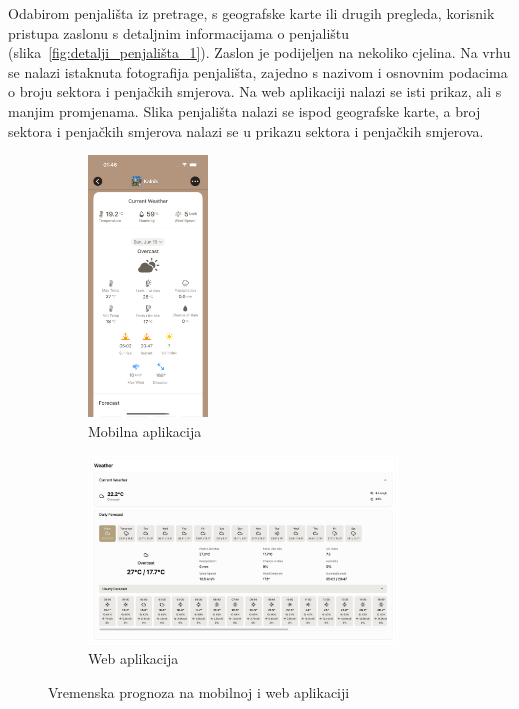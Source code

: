 Odabirom penjališta iz pretrage, s geografske karte ili drugih pregleda, korisnik pristupa zaslonu s detaljnim informacijama o penjalištu (slika~\ref{fig:detalji_penjališta_1}). Zaslon je podijeljen na nekoliko cjelina. Na vrhu se nalazi istaknuta fotografija penjališta, zajedno s nazivom i osnovnim podacima o broju sektora i penjačkih smjerova. 
Na web aplikaciji nalazi se isti prikaz, ali s manjim promjenama. Slika penjališta nalazi se ispod geografske karte, a broj sektora i penjačkih smjerova nalazi se u prikazu sektora i penjačkih smjerova.

\begin{figure}[H]
    \centering
    \begin{subfigure}[b]{\textwidth}
        \centering
        \includegraphics[width=0.35\textwidth]{images/implementacija/crag-details/crag-weather-1.png}
        \caption{Mobilna aplikacija}
        \label{fig:vremenska_prognoza_mob}
    \end{subfigure}
    \hfill
    \begin{subfigure}[b]{\textwidth}
        \centering
        \includegraphics[width=0.9\textwidth]{images/implementacija/web/crag-details/crag-weather.png}
        \caption{Web aplikacija}
        \label{fig:vremenska_prognoza_web}
    \end{subfigure}
    \caption{Vremenska prognoza na mobilnoj i web aplikaciji}
    \label{fig:vremenska_prognoza}
\end{figure}

